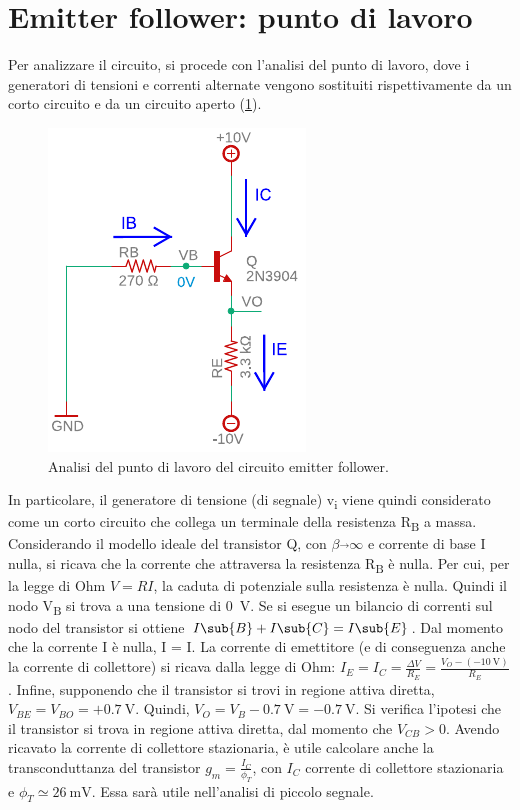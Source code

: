 \section{Emitter follower: punto di lavoro}
Per analizzare il circuito, si procede con l'analisi del punto di lavoro, dove i generatori di tensioni e correnti alternate vengono sostituiti rispettivamente da un corto circuito e da un circuito aperto (\Fig\ref{fig:emitterfollwer_puntodilavoro}).
\begin{figure}[h!]
	\centering
	\includegraphics[width=0.4\linewidth]{./OtherFiles/Laboratorio 1/emitter follower_punto di lavoro_printout}
	\caption{Analisi del punto di lavoro del circuito emitter follower.}
	\label{fig:emitterfollwer_puntodilavoro}
\end{figure}
In particolare, il generatore di tensione (di segnale) v\textsubscript{i} viene quindi considerato come un corto circuito che collega un terminale della resistenza R\textsubscript{B} a massa. Considerando il modello ideale del transistor Q, con $\beta\overrightarrow{}\infty$ e corrente di base I nulla, si ricava che la corrente che attraversa la resistenza R\textsubscript{B} è nulla. Per cui, per la legge di Ohm $V=RI$, la caduta di potenziale sulla resistenza è nulla. Quindi il nodo V\textsubscript{B} si trova a una tensione di \SI{0}{\volt}. Se si esegue un bilancio di correnti sul nodo del transistor si ottiene $I\sub{B}+I\sub{C}=I\sub{E}$. Dal momento che la corrente I è nulla, I = I. La corrente di emettitore (e di conseguenza anche la corrente di collettore) si ricava dalla legge di Ohm: $I_E=I_C=\frac{\Delta V}{R_E}=\frac{V_O-(-\SI{10}{\volt})}{R_E}$. Infine, supponendo che il transistor si trovi in regione attiva diretta, $V_{BE}=V_{BO}=+\SI{0.7}{\volt}$. Quindi, $V_O=V_B-\SI{0.7}{\volt}= -\SI{0.7}{\volt}$. Si verifica l'ipotesi che il transistor si trova in regione attiva diretta, dal momento che $V_{CB}>0$. Avendo ricavato la corrente di collettore stazionaria, è utile calcolare anche la transconduttanza del transistor $g_m=\frac{I_C}{\phi_T}$, con $I_C$ corrente di collettore stazionaria e $\phi_T\simeq\SI{26}{\milli\volt}$. Essa sarà utile nell'analisi di piccolo segnale.

